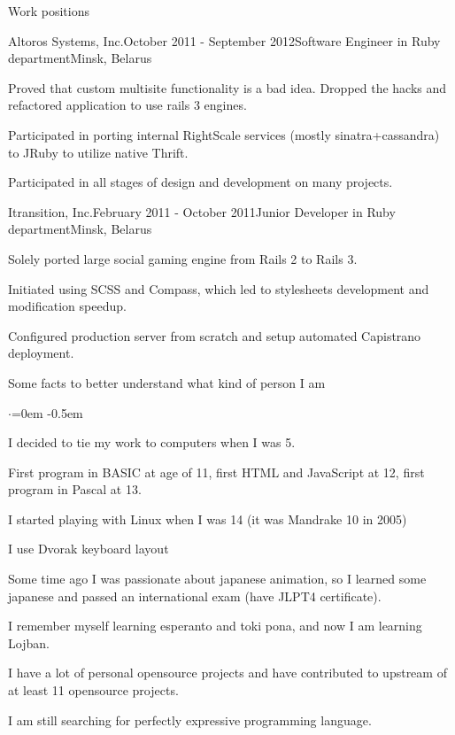 \documentclass{resume} %
\begin{document}
\begin{rSection}{Work positions}
\begin{rSubsection}{Altoros Systems, Inc.}{October 2011 - September 2012}{Software Engineer in Ruby department}{Minsk, Belarus}
\item Proved that custom multisite functionality is a bad idea. Dropped the hacks and refactored application to use rails 3 engines.
\item Participated in porting internal RightScale services (mostly sinatra+cassandra) to JRuby to utilize native Thrift.
\item Participated in all stages of design and development on many projects.
\end{rSubsection}

\begin{rSubsection}{Itransition, Inc.}{February 2011 - October 2011}{Junior Developer in Ruby department}{Minsk, Belarus}
\item Solely ported large social gaming engine from Rails 2 to Rails 3.
\item Initiated using SCSS and Compass, which led to stylesheets development and modification speedup.
\item Configured production server from scratch and setup automated Capistrano deployment.
\end{rSubsection}

\end{rSection}


\begin{rSection}{Some facts to better understand what kind of person I am}
  \smallskip
  \begin{list}{$\cdot$}{\leftmargin=0em} %
    \itemsep -0.5em \vspace{-0.5em} %
  \item I decided to tie my work to computers when I was 5.
  \item First program in BASIC at age of 11, first HTML and JavaScript at 12, first program in Pascal at 13.
  \item I started playing with Linux when I was 14 (it was Mandrake 10 in 2005)
  \item I use Dvorak keyboard layout
  \item Some time ago I was passionate about japanese animation, so I learned
    some japanese and passed an international exam (have JLPT4 certificate).
  \item I remember myself learning esperanto and toki pona, and now I am learning Lojban.
  \item I have a lot of personal opensource projects and have contributed to
     upstream of at least 11 opensource projects.
  \item I am still searching for perfectly expressive programming language.
  \end{list}
\end{rSection}

\end{document}
